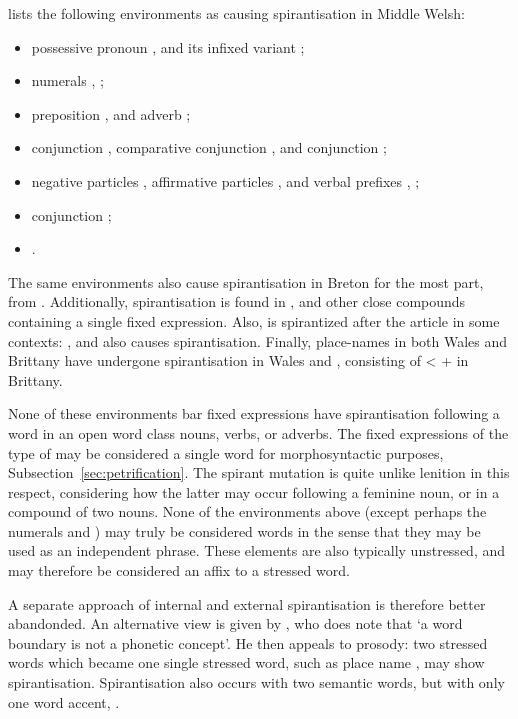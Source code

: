 \Textcite[\S 24]{evans_grammar_1964} lists the following environments as causing spirantisation in  Middle Welsh:
\begin{itemize}
\item possessive pronoun , and its infixed variant ;
\item numerals , ;
\item preposition , and adverb ;
\item conjunction , comparative conjunction , and conjunction ;
\item negative particles , affirmative particles , and verbal prefixes , \etc;
\item conjunction ;
\item {}.
\end{itemize}
The same environments also cause spirantisation in Breton for the most part, \eg {} from .
Additionally,  spirantisation is found in , and other close compounds containing a single fixed expression.
Also,  is spirantized after the article in some contexts: , and  also causes spirantisation.
Finally, place-names in both Wales and Brittany have undergone spirantisation \eg {} in Wales and , consisting of  <  +  in Brittany.

None of these environments bar fixed expressions have spirantisation following a word in an open word class \ie nouns, verbs, or adverbs.
The fixed expressions of the type of  may be considered a single word for morphosyntactic purposes, \cf Subsection~\ref{sec:petrification}.
The spirant mutation is quite unlike lenition in this respect, considering how the latter may occur \eg following a feminine noun, or in a compound of two nouns. None of the environments above (except perhaps the numerals  and ) may truly be considered words in the sense that they may be used as an independent phrase.
These elements are also typically unstressed, and may therefore be considered an affix to a stressed word.

A separate approach of internal and external spirantisation is therefore better abandonded. An alternative view is given by \textcite[126--129]{koch_neo-brittonic_1989}, who does note that `a word boundary is not a phonetic concept'.
He then appeals to prosody: two stressed words which became one single stressed word, such as place name , may show spirantisation.
Spirantisation also occurs with two semantic words, but with only one word accent, \eg {}.

